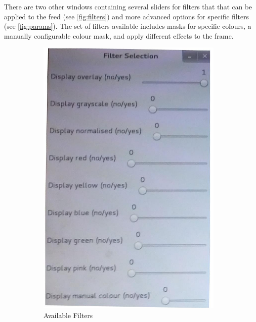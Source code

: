 There are two other windows containing several sliders for filters that that can be applied to the feed (see \autoref{fig:filters}) and more advanced options for specific filters (see \autoref{fig:params}). The set of filters available includes masks for specific colours, a manually configurable colour mask, and apply different effects to the frame.



\begin{figure}[H]
\centering
\begin{subfigure}{.5\textwidth}
\centering
\includegraphics[scale=0.2]{vision_filters}
\caption{Available Filters}
\label{fig:filters}
\end{subfigure}%
\begin{subfigure}{.5\textwidth}

\end{subfigure}
\end{figure}
